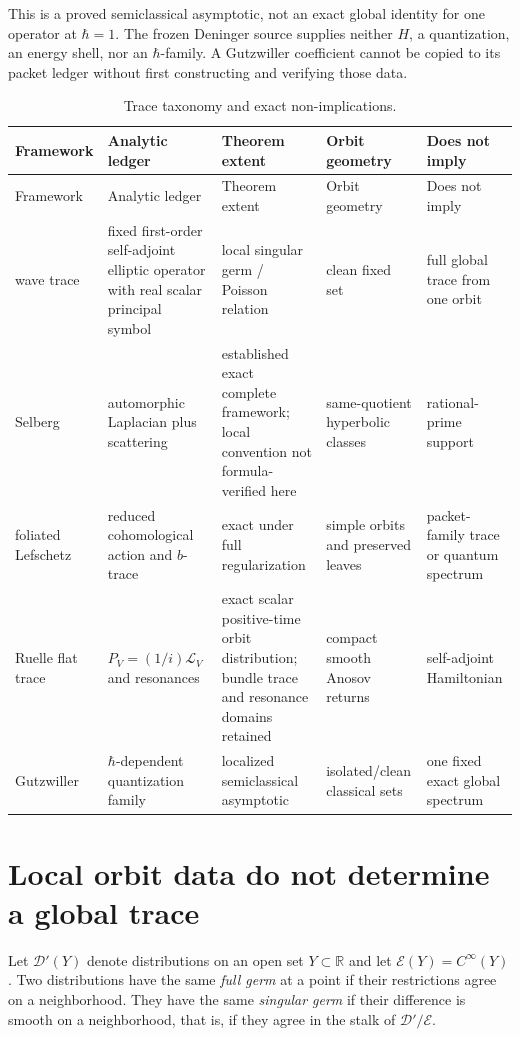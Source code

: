 \documentclass[11pt]{article}
\theoremstyle{definition}
\theoremstyle{remark}
\newcommand{\R}{\mathbb{R}}
\newcommand{\D}{\mathcal{D}}
\newcommand{\E}{\mathcal{E}}
\begin{document}
This is a proved semiclassical asymptotic, not an exact global identity for
one operator at \(\hbar=1\).  The frozen Deninger source supplies neither
\(H\), a quantization, an energy shell, nor an \(\hbar\)-family.  A
Gutzwiller coefficient cannot be copied to its packet ledger without first
constructing and verifying those data.

\begin{longtable}{P{0.14\textwidth}P{0.19\textwidth}P{0.18\textwidth}P{0.18\textwidth}P{0.18\textwidth}}
\caption{Trace taxonomy and exact non-implications.}\label{tab:taxonomy}\\
\toprule
Framework & Analytic ledger & Theorem extent & Orbit geometry & Does not imply\\
\midrule
\endfirsthead
\toprule
Framework & Analytic ledger & Theorem extent & Orbit geometry & Does not imply\\
\midrule
\endhead
wave trace & fixed first-order self-adjoint elliptic operator with real scalar principal symbol & local singular germ / Poisson relation & clean fixed set & full global trace from one orbit\\
Selberg & automorphic Laplacian plus scattering & established exact complete framework; local convention not formula-verified here & same-quotient hyperbolic classes & rational-prime support\\
foliated Lefschetz & reduced cohomological action and \(b\)-trace & exact under full regularization & simple orbits and preserved leaves & packet-family trace or quantum spectrum\\
Ruelle flat trace & \(P_V=(1/i)\mathcal L_V\) and resonances & exact scalar positive-time orbit distribution; bundle trace and resonance domains retained & compact smooth Anosov returns & self-adjoint Hamiltonian\\
Gutzwiller & \(\hbar\)-dependent quantization family & localized semiclassical asymptotic & isolated/clean classical sets & one fixed exact global spectrum\\
\bottomrule
\end{longtable}

\section{Local orbit data do not determine a global trace}
\label{sec:germs}

Let \(\D'(Y)\) denote distributions on an open set \(Y\subset\R\) and let
\(\E(Y)=C^\infty(Y)\).  Two distributions have the same \emph{full germ} at
a point if their restrictions agree on a neighborhood.  They have the same
\emph{singular germ} if their difference is smooth on a neighborhood, that
is, if they agree in the stalk of \(\D'/\E\).
\end{document}
